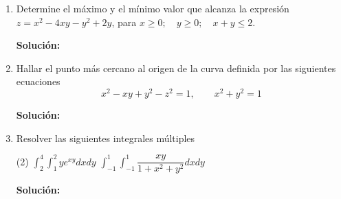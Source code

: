 \documentclass[12pt]{article}
\newenvironment{solucion}
{\begin{mdframed}[backgroundcolor=black!10]
		{\bf Solución:}\\
	}
	{
	\end{mdframed}
}
\newenvironment{preguntas}
{\begin{enumerate}\itemsep12pt
	}
	{
	\end{enumerate}
}
\newcommand{\ra}{\rightarrow}
\begin{document}
\begin{preguntas}
\begin{solucion}
\begin{itemize}
$$1 + y^2 = 10 \ra y^2 = 9 \ra y_1 = 3, \quad y_2 = -3$$
Por lo tanto, los puntos obtenidos son
$$P_4(-1,3), \quad P_5(-1,-3)$$
\end{itemize}
Finalmente, evaluamos los puntos críticos obtenidos en la función original, esto es
$$f(P_1) = f(1,0) = 1-2+3 =2$$
$$f(P_2) = f(\sqrt[]{10},0) = 10 - 2\ \sqrt[]{10} + 3 = 13 - 2\ \sqrt[]{10}$$
$$f(P_3) = f(-\ \sqrt[]{10},0) = 10 + 2\ \sqrt[]{10} + 3 = 13 + 2\ \sqrt[]{10}$$
$$f(P_4) = f(-1,3) = 1+18+2+3=24$$
$$f(P_5) = f(-1,-3) = 1+18+2+3=24$$
Por lo tanto, concluimos que el máximo es $24$ ($P_4$ y $P_5$) y el mínimo es 2 ($P_1$).
\end{solucion}
\item Determine el máximo y el mínimo valor que alcanza la expresión $z=x^2-4xy-y^2+2y$, para $x\geq0;\quad y\geq0;\quad x+y\leq2$.
\begin{solucion}

\end{solucion}
\item Hallar el punto más cercano al origen de la curva definida por las siguientes ecuaciones
	$$x^2-xy+y^2-z^2=1,\qquad x^2+y^2=1$$
\begin{solucion}

\end{solucion}
\item Resolver las siguientes integrales múltiples
\begin{tasks}(2)
\task $\displaystyle\int_2^4 \displaystyle\int_1^2 ye^{xy}dxdy$
\task $\displaystyle\int_{-1}^1\displaystyle\int_{-1}^1 \dfrac{xy}{1+x^2+y^2}dxdy$
\end{tasks}
\begin{solucion}


\end{solucion}
\end{preguntas}
\end{document}
